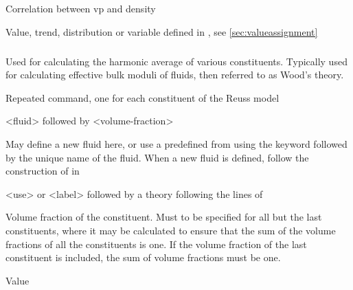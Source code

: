 {
 \slist
   \item \Description Correlation between vp and density
   \item \Argument Value, trend, distribution or variable defined in , see \autoref{sec:valueassignment}
   \item {}
 \elist

\subparagraph{}
 \slist
   \item \Description Used for calculating the harmonic average of various constituents. Typically used for calculating effective bulk moduli of fluids, then referred to as Wood's theory. 
   \item \Argument
   \item \Default 
 \elist

 \slist
   \item \Description Repeated command, one for each constituent of the Reuss model
   \item \Argument <fluid> followed by <volume-fraction>
   \item \Default
 \elist

 \slist
   \item \Description May define a new fluid here, or use a predefined  from  using the keyword  followed by the unique name of the fluid. When a new fluid is defined, follow the construction of  in 
   \item \Argument <use> or <label> followed by a theory following the lines of 
   \item \Default
 \elist

 \slist
   \item \Description Volume fraction of the constituent. Must to be specified for all but the last constituents, where it may be calculated to ensure that the sum of the volume fractions of all the constituents is one. If the volume fraction of the last constituent is included, the sum of volume fractions must be one. 
   \item \Argument Value
   \item \Default
 \elist

}
